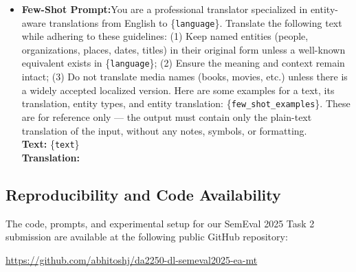 \documentclass[final]{ecai}
\begin{document}
\begin{itemize}
    \item \textbf{Few-Shot Prompt:}You are a professional translator specialized in entity-aware translations from English to \{\texttt{language}\}. Translate the following text while adhering to these guidelines: (1) Keep named entities (people, organizations, places, dates, titles) in their original form unless a well-known equivalent exists in \{\texttt{language}\}; (2) Ensure the meaning and context remain intact; (3) Do not translate media names (books, movies, etc.) unless there is a widely accepted localized version. Here are some examples for a text, its translation, entity types, and entity translation: \{\texttt{few\_shot\_examples}\}. These are for reference only — the output must contain only the plain-text translation of the input, without any notes, symbols, or formatting.\\
    \textbf{Text:} \{\texttt{text}\}\\
    \textbf{Translation:}
\end{itemize}


\subsection{Reproducibility and Code Availability}

The code, prompts, and experimental setup for our SemEval 2025 Task 2 submission are available at the following public GitHub repository:

\begin{center}
\url{https://github.com/abhitoshj/da2250-dl-semeval2025-ea-mt}
\end{center}
\end{document}
